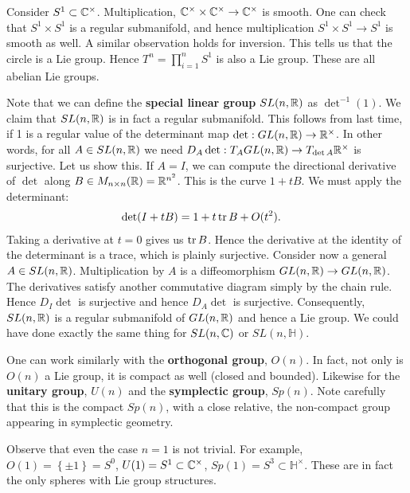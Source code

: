 \documentclass{../mathnotes}
\begin{document}
\begin{exmp}
    Consider $S^1\subset\mathbb{C}^\times$. Multiplication, $\mathbb{C}^\times\times\mathbb{C}^\times\to\mathbb{C}^\times$ is smooth. One can check that $S^1\times S^1$ is a regular submanifold,
    and hence multiplication $S^1\times S^1\to S^1$ is smooth as well. A similar observation holds for inversion. This tells us that the circle is a Lie group.
    Hence $T^n=\prod^n_{i=1}S^1$ is also a Lie group. These are all abelian Lie groups.

    Note that we can define the \textbf{special linear group} $SL(n,\mathbb{R})$ as $\det^{-1}(1)$. We claim that $SL(n,\mathbb{R})$ is in fact a regular submanifold.
    This follows from last time, if 1 is a regular value of the determinant map $\det: GL(n,\mathbb{R})\to\mathbb{R}^\times$. In other words, for all $A\in SL(n,\mathbb{R})$ we need 
    $D_A\det:T_AGL(n,\mathbb{R})\to T_{\det A}\mathbb{R}^\times$ is surjective. Let us show this.
    If $A=I$, we can compute the directional derivative of $\det$ along $B\in M_{n\times n}(\mathbb{R})=\mathbb{R}^{n^2}$. This is the curve $1+tB$. We must apply the determinant:
    \begin{align*}
        \det(I+tB)&=1+t\operatorname{tr} B+O(t^2).
    \end{align*}
    Taking a derivative at $t=0$ gives us $\operatorname{tr} B$. Hence the derivative at the identity of the determinant is a trace, which is plainly surjective.
    Consider now a general $A\in SL(n,\mathbb{R})$. Multiplication by $A$ is a diffeomorphism $GL(n,\mathbb{R})\to GL(n,\mathbb{R})$.
    The derivatives satisfy another commutative diagram simply by the chain rule. Hence $D_I\det$ is surjective and hence $D_A\det$ is surjective.
    Consequently, $SL(n,\mathbb{R})$ is a regular submanifold of $GL(n,\mathbb{R})$ and hence a Lie group. We could have done exactly the same thing for $SL(n,\mathbb{C})$ or $SL(n,\mathbb{H})$.

    One can work similarly with the \textbf{orthogonal group}, $O(n)$. In fact, not only is $O(n)$ a Lie group, it is compact as well (closed and bounded).
    Likewise for the \textbf{unitary group}, $U(n)$ and the \textbf{symplectic group}, $Sp(n)$. Note carefully that this is the compact $Sp(n)$, with a close
    relative, the non-compact group appearing in symplectic geometry.

    Observe that even the case $n=1$ is not trivial. For example, $O(1)=\left\{ \pm 1 \right\}=S^0$, $U(1)=S^1\subset\mathbb{C}^\times$, $Sp(1)=S^3\subset\mathbb{H}^\times$.
    These are in fact the only spheres with Lie group structures.
\end{exmp}
\end{document}
